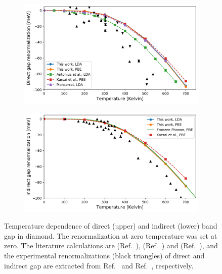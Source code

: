 \documentclass[journal=jctcce,manuscript=article]{achemso}
\begin{document}
\begin{figure}[htbp]
    \centering
    \begin{subfigure}[b]{0.8\textwidth}
    \includegraphics[width=\textwidth]{fig/Diamond_temperature_dependence_direct.png}
    \end{subfigure}
        \begin{subfigure}[b]{0.8\textwidth}
    \includegraphics[width=\textwidth]{fig/Diamond_temperature_dependence_indirect.png}
    \end{subfigure}
    \caption[width=0.8\textwidth]{Temperature dependence of direct (upper) and indirect (lower) band gap in diamond. The renormalization at zero temperature was set at zero. The literature calculations are \citeauthor{antonius2014many} (Ref.~), \citeauthor{karsai2018electron} (Ref.~) and \citeauthor{monserrat2016correlation} (Ref.~), and the experimental renormalizations (black triangles) of direct and indirect gap are extracted from Ref.~ and Ref.~, respectively.}
    \label{fig:temperature_dependence}
\end{figure}
\end{document}
